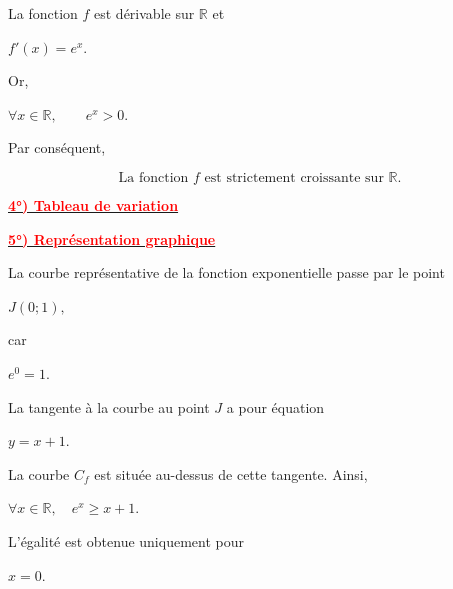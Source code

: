 \documentclass[12pt,a4paper]{article}
\begin{document}
La fonction \(f\) est dérivable sur \(\mathbb{R}\) et

\(
f'(x)=e^x.
\)

Or,

\(
\forall x\in\mathbb{R},\qquad e^x>0.
\)

Par conséquent,

\[
\boxed{\text{La fonction }f\text{ est strictement croissante sur }\mathbb{R}.}
\]

\underline{\textbf{\textcolor{red}{4°) Tableau de variation}}}




\vspace{0.5cm}

\underline{\textbf{\textcolor{red}{5°) Représentation graphique}}}


La courbe représentative de la fonction exponentielle passe par le point

\(
J(0;1),
\)

car

\(
e^0=1.
\)

La tangente à la courbe au point \(J\) a pour équation

\(
y=x+1.
\)

La courbe \(C_f\) est située au-dessus de cette tangente. Ainsi,

\(
\boxed{\forall x\in\mathbb{R},\quad e^x\ge x+1.}
\)

L'égalité est obtenue uniquement pour

\(
x=0.
\)

\end{document}
